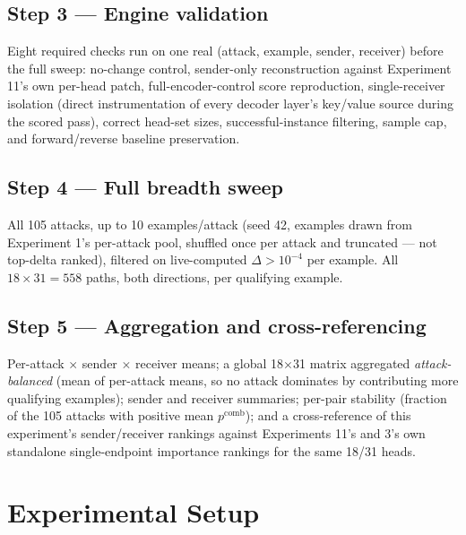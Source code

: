 \documentclass[11pt]{article}
\newcommand{\pcomb}{\ensuremath{p^{\mathrm{comb}}}}
\begin{document}
\subsection{Step 3 --- Engine validation}
Eight required checks run on one real (attack, example, sender, receiver)
before the full sweep: no-change control, sender-only reconstruction against
Experiment 11's own per-head patch, full-encoder-control score reproduction,
single-receiver isolation (direct instrumentation of every decoder layer's
key/value source during the scored pass), correct head-set sizes, successful-instance
filtering, sample cap, and forward/reverse baseline preservation.

\subsection{Step 4 --- Full breadth sweep}
All 105 attacks, up to 10 examples/attack (seed 42, examples drawn from
Experiment 1's per-attack pool, shuffled once per attack and truncated —
not top-delta ranked), filtered on live-computed $\Delta > 10^{-4}$ per
example. All $18 \times 31 = 558$ paths, both directions, per qualifying
example.

\subsection{Step 5 --- Aggregation and cross-referencing}
Per-attack $\times$ sender $\times$ receiver means; a global 18$\times$31
matrix aggregated \emph{attack-balanced} (mean of per-attack means, so no
attack dominates by contributing more qualifying examples); sender and
receiver summaries; per-pair stability (fraction of the 105 attacks with
positive mean $\pcomb$); and a cross-reference of this experiment's
sender/receiver rankings against Experiments 11's and 3's own standalone
single-endpoint importance rankings for the same 18/31 heads.

\section{Experimental Setup}
\label{sec:setup}
\end{document}
